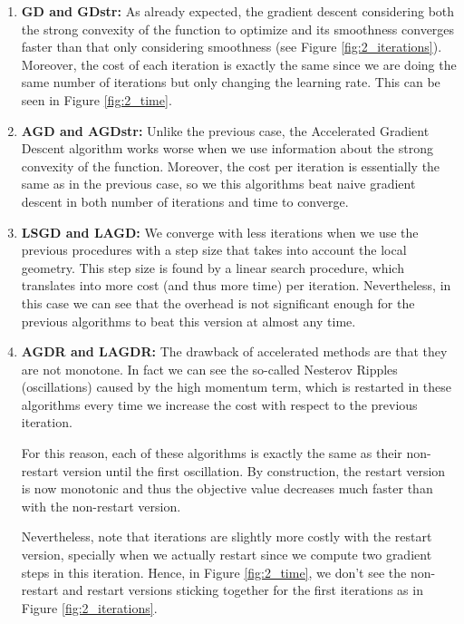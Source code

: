 \documentclass[letterpaper]{article}
\providecommand{\1}{\mathbf{1}}
\providecommand{\0}{\mathbf{0}}
\begin{document}
\begin{enumerate}[label=(\alph*)]
    \item \textbf{GD and GDstr: }As already expected, the gradient descent considering both the strong convexity of the function to optimize and its smoothness converges faster than that only considering smoothness (see Figure \ref{fig:2_iterations}). Moreover, the cost of each iteration is exactly the same since we are doing the same number of iterations but only changing the learning rate. This can be seen in Figure \ref{fig:2_time}.
    
    \item \textbf{AGD and AGDstr: }Unlike the previous case, the Accelerated Gradient Descent algorithm works worse when we use information about the strong convexity of the function. Moreover, the cost per iteration is essentially the same as in the previous case, so we this algorithms beat naive gradient descent in both number of iterations and time to converge.
    
    \item \textbf{LSGD and LAGD: }We converge with less iterations when we use the previous procedures with a step size that takes into account the local geometry. This step size is found by a linear search procedure, which translates into more cost (and thus more time) per iteration. Nevertheless, in this case we can see that the overhead is not significant enough for the previous algorithms to beat this version at almost any time.
    
    \item \textbf{AGDR and LAGDR: }The drawback of accelerated methods are that they are not monotone. In fact we can see the so-called Nesterov Ripples (oscillations) caused by the high momentum term, which is restarted in these algorithms every time we increase the cost with respect to the previous iteration.
    
    For this reason, each of these algorithms is exactly the same as their non-restart version until the first oscillation. By construction, the restart version is now monotonic and thus the objective value decreases much faster than with the non-restart version.
    
    Nevertheless, note that iterations are slightly more costly with the restart version, specially when we actually restart since we compute two gradient steps in this iteration. Hence, in Figure \ref{fig:2_time}, we don't see the non-restart and restart versions sticking together for the first iterations as in Figure \ref{fig:2_iterations}.
    

\end{enumerate}
\end{document}
